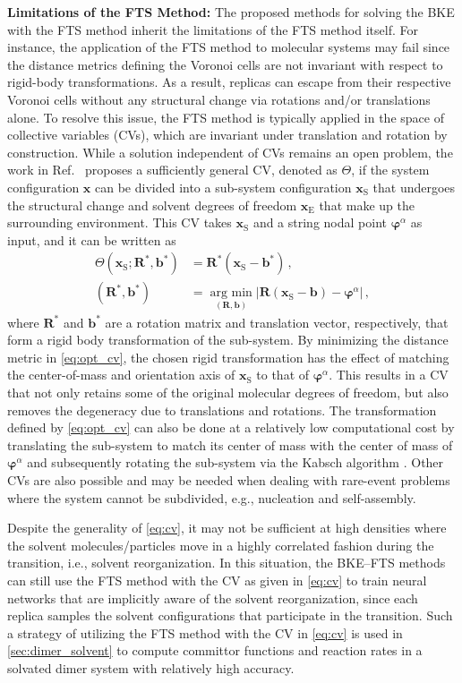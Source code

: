 \documentclass{article}
\numberwithin{equation}{section}
\def\*#1{\mathbf{#1}}
\theoremstyle{definition}
\theoremstyle{remark}
\def\varphib{\boldsymbol{\varphi}}
\DeclareRobustCommand{\argmin}{\operatorname*{arg \ min}}
\begin{document}
\textbf{Limitations of the FTS Method:} The proposed methods for solving the BKE with the FTS method inherit the limitations of the FTS method itself. For instance, the application of the FTS method to molecular systems may fail since the distance metrics defining the Voronoi cells are not invariant with respect to rigid-body transformations. As a result, replicas can escape from their respective Voronoi cells without any structural change via rotations and/or translations alone. To resolve this issue, the FTS method is typically applied in the space of collective variables (CVs), which are invariant under translation and rotation by construction. While a solution independent of CVs remains an open problem, the work in Ref.~\cite{vanden2009revisiting} proposes a sufficiently general CV, denoted as $\Theta$, if the system configuration $\* x$ can be divided into a sub-system configuration $\* x_\mathrm{S}$ that undergoes the structural change and solvent degrees of freedom $\* x_\mathrm{E}$ that make up the surrounding environment. This CV takes $\* x_\mathrm{S}$ and a string nodal point $\varphib^\alpha$ as input, and it can be written as 
\begin{align}
    \Theta ( \* x_\mathrm{S} ; \* R^*, \* b^*) &= \* R^* \left( \* x_\mathrm{S} - \* b^* \right) \,, \label{eq:cv}
    \\
    (\* R^*, \* b^*) &= \argmin_{(\* R, \* b)} | \* R \left( \* x_\mathrm{S} - \* b \right) - \varphib^\alpha | \,,  \label{eq:opt_cv}
\end{align}
where $ \* R^* $ and $\* b^*$ are a rotation matrix and translation vector, respectively, that form a rigid body transformation of the sub-system.
By minimizing the distance metric in \cref{eq:opt_cv}, the chosen rigid transformation has the effect of matching the center-of-mass and orientation axis of $\* x_\mathrm{S}$ to that of  $\varphib^\alpha$. This results in a CV that not only retains some of the original molecular degrees of freedom, but also removes the degeneracy due to translations and rotations. The transformation defined by \cref{eq:opt_cv} can also be done at a relatively low computational cost by translating the sub-system to match its center of mass with the center of mass of $\varphib^\alpha$ and subsequently rotating the sub-system via the Kabsch algorithm \cite{kabsch1976solution}. Other CVs are also possible and may be needed when dealing with rare-event problems  where the system cannot be subdivided, e.g., nucleation and self-assembly. 

Despite the generality of \cref{eq:cv}, it may not be sufficient at high densities where the solvent molecules/particles move in a highly correlated fashion during the transition, i.e., solvent reorganization.
In this situation, the BKE--FTS methods can still use the FTS method with the CV as given in \cref{eq:cv} to train neural networks that are implicitly aware of the solvent reorganization, since each replica samples the solvent configurations that participate in the transition. Such a strategy of utilizing the FTS method with the CV in \cref{eq:cv} is used in \cref{sec:dimer_solvent} to compute committor functions and reaction rates in a solvated dimer system with relatively high accuracy. 
\end{document}
